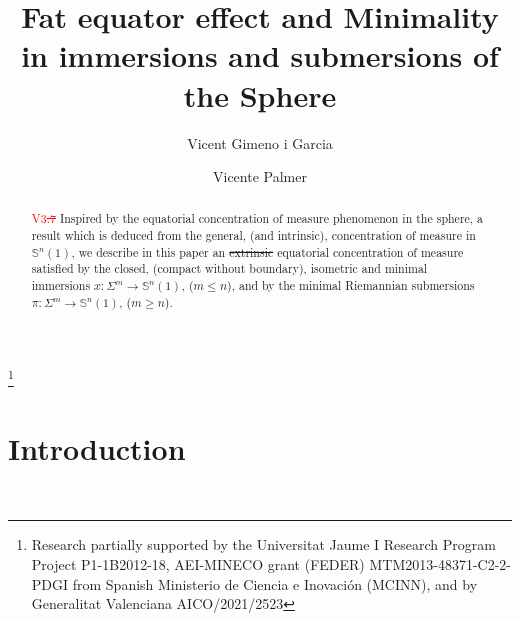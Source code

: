 \documentclass{amsart}
\theoremstyle{definition}
\theoremstyle{remark}
\newcommand{\ese}{\mathbb{S}}
\providecommand{\DIFadd}[1]{{\protect\color{blue}\uwave{#1}}} %
\providecommand{\DIFdel}[1]{{\protect\color{red}\sout{#1}}}                      %
\providecommand{\DIFaddbegin}{} %
\providecommand{\DIFaddend}{} %
\providecommand{\DIFdelbegin}{} %
\providecommand{\DIFdelend}{} %
\begin{document}
\title[Fat equator effect and minimality]{Fat equator effect and Minimality in immersions and submersions of the Sphere}





\author{Vicent Gimeno i Garcia}
\address{Department of Mathematics, Universitat Jaume I-IMAC,   E-12071, 
Castell\'{o}, Spain}
\author{Vicente Palmer}
\address{Department of Mathematics, Universitat Jaume I-INIT,   E-12071, 
Castell\'{o}, Spain}

\thanks{Research partially supported by  the Universitat Jaume I Research Program Project P1-1B2012-18, AEI-MINECO grant (FEDER) MTM2013-48371-C2-2-PDGI from Spanish Ministerio de Ciencia e Inovaci\'{o}n (MCINN), and by Generalitat Valenciana AICO/2021/2523}





\dedicatory{}



\begin{abstract}\textcolor{red}{V3\DIFdelbegin \DIFdel{.7}\DIFdelend \DIFaddbegin \DIFadd{.8}\DIFaddend }
Inspired by the equatorial concentration of measure phenomenon in the sphere, a result which is deduced from the general, (and intrinsic), concentration of measure in $\ese^n(1)$, we describe in this paper an \DIFdelbegin \DIFdel{extrinsic }\DIFdelend equatorial concentration of measure satisfied by the closed, (compact without boundary), isometric and minimal immersions $x:\Sigma^m \rightarrow \ese^n(1)$, ($m \leq n$), and by the minimal Riemannian submersions $\pi: \Sigma^m \rightarrow \ese^n(1)$, ($m \geq n$).\end{abstract}

\maketitle

\section{Introduction}\label{sec:intro}\
\end{document}
